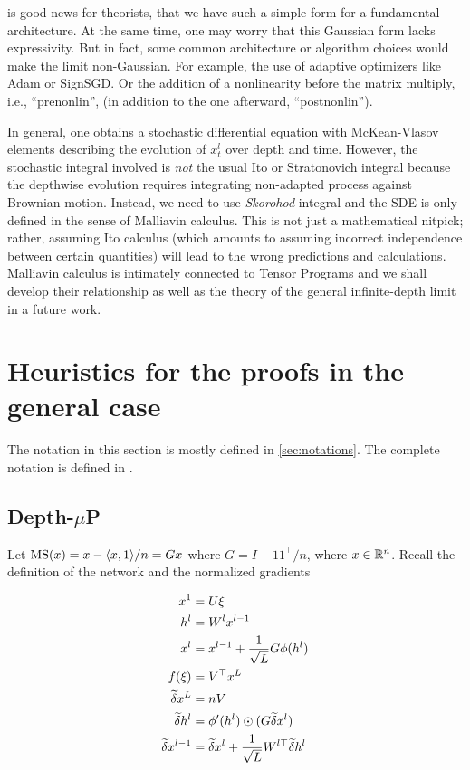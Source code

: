 \documentclass{article}
\theoremstyle{plain}
\theoremstyle{definition}
\begin{document}
 is good news for theorists, that we have such a simple form for a fundamental architecture.
At the same time, one may worry that this Gaussian form lacks expressivity.
But in fact, some common architecture or algorithm choices would make the limit non-Gaussian.
For example, the use of adaptive optimizers like Adam or SignSGD.
Or the addition of a nonlinearity before the matrix multiply, i.e., ``prenonlin'', (in addition to the one afterward, ``postnonlin'').

In general, one obtains a stochastic differential equation with McKean-Vlasov elements describing the evolution of $x^l_t$ over depth and time. However, the stochastic integral involved is \emph{not} the usual Ito or Stratonovich integral because the depthwise evolution requires integrating non-adapted process against Brownian motion. Instead, we need to use \emph{Skorohod} integral and the SDE is only defined in the sense of Malliavin calculus.
This is not just a mathematical nitpick; rather, assuming Ito calculus (which amounts to assuming incorrect independence between certain quantities) will lead to the wrong predictions and calculations.
Malliavin calculus is intimately connected to Tensor Programs and we shall develop their relationship as well as the theory of the general infinite-depth limit in a future work.

\section{Heuristics for the proofs in the general case}

The notation in this section is mostly defined in \cref{sec:notations}. The complete notation is defined in \cite{yang2023tensor}.
\subsection{Depth-$\mu$P}\label{heuristics:depth-mup}

Let $\mathrm{MS}(x)=x-\langle x,1\rangle/n=Gx$ where $G=I-11^{\top}/n$,
where $x\in\mathbb{R}^{n}$. Recall the definition of the network and the normalized gradients

\begin{align*}
x^{1} & =U\xi\\
h^{l} & =W^{l}x^{l-1}\\
x^{l} & =x^{l-1}+\frac{1}{\sqrt{L}}G\phi(h^{l})\\
f(\xi) & =V^{\top}x^{L}\\
\widetilde{\delta} x^{L} & =nV\\
\widetilde{\delta} h^{l} & =\phi'(h^{l})\odot(G\widetilde{\delta} x^{l})\\
\widetilde{\delta} x^{l-1} & =\widetilde{\delta} x^{l}+\frac{1}{\sqrt{L}}W^{l\top}\widetilde{\delta} h^{l}
\end{align*}
\end{document}
